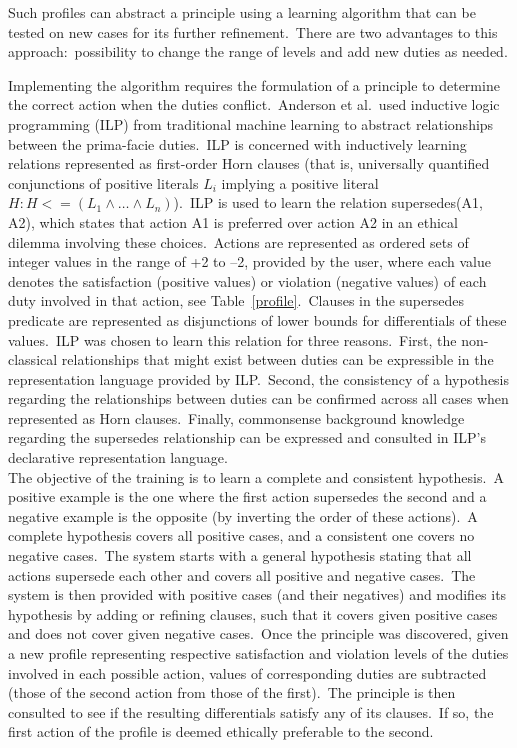 Such profiles can abstract a principle using a learning algorithm that can be tested on new cases for its further refinement.\ There are two advantages to this approach:\ possibility to change the range of levels and add new duties as needed. \nowidow[]

 Implementing the algorithm requires the formulation of a principle to determine the correct action when the duties conflict.\ Anderson et al.\ used inductive logic programming (ILP) from traditional machine learning to abstract relationships between the prima-facie duties.\ ILP is concerned with inductively learning relations represented as first-order Horn clauses (that is, universally quantified conjunctions of positive literals $L_i$ implying a positive literal $H: H <= (L_1 ∧ … ∧ L_n)$).\ ILP is used to learn the relation supersedes(A1, A2), which states that action A1 is preferred over action A2 in an ethical dilemma involving these choices.\ Actions are represented as ordered sets of integer values in the range of +2 to –2, provided by the user, where each value denotes the satisfaction (positive values) or violation (negative values) of each duty involved in that action, see Table~\ref{profile}.\ Clauses in the supersedes predicate are represented as disjunctions of lower bounds for differentials of these values.\ ILP was chosen to learn this relation for three reasons.\ First, the non-classical relationships that might exist between duties can be expressible in the representation language provided by ILP.\ Second, the consistency of a hypothesis regarding the relationships between duties can be confirmed across all cases when represented as Horn clauses.\ Finally, commonsense background knowledge regarding the supersedes relationship can be expressed and consulted in ILP’s declarative representation language.\\ 
\indent The objective of the training is to learn a complete and consistent hypothesis.\ A positive example is the one where the first action supersedes the second and a negative example is the opposite (by inverting the order of these actions).\ A complete hypothesis covers all positive cases, and a consistent one covers no negative cases.\ The system starts with a general hypothesis stating that all actions supersede each other and covers all positive and negative cases.\ The system is then provided with positive cases (and their negatives) and modifies its hypothesis by adding or refining clauses, such that it covers given positive cases and does not cover given negative cases.\ Once the principle was discovered, given a new profile representing respective satisfaction and violation levels of the duties involved in each possible action, values of corresponding duties are subtracted (those of the second action from those of the first).\ The principle is then consulted to see if the resulting differentials satisfy any of its clauses.\ If so, the first action of the profile is deemed ethically preferable to the second. 

